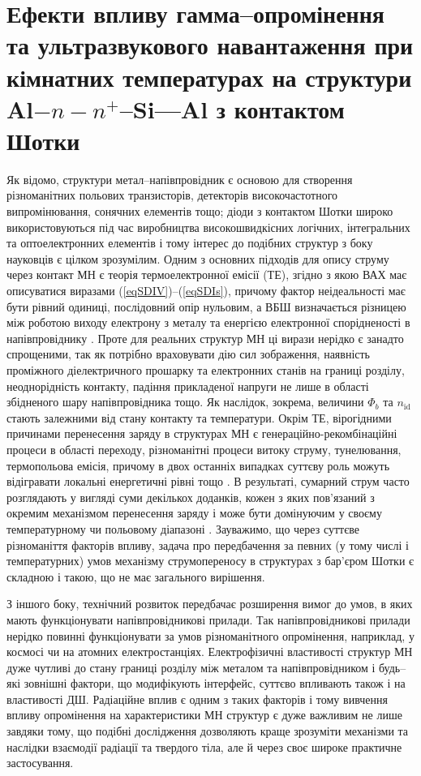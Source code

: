 \chapter{Ефекти впливу гамма--опромінення та ультразвукового навантаження при кімнатних температурах
на структури Al$-n-n^+$--Si---Al з контактом Шотки\label{Ch_GammaSD}}

Як відомо, структури метал--напівпровідник є основою для створення різноманітних польових транзисторів, детекторів високочастотного
випромінювання, сонячних елементів тощо;
діоди з контактом Шотки широко використовуються під час виробництва високошвидкісних логічних, інтегральних та оптоелектронних елементів
і тому інтерес до подібних структур з боку науковців є цілком зрозумілим.
Одним з основних підходів для опису струму через контакт МН є теорія термоелектронної емісії (ТЕ),
згідно з якою \cite{Colinge,Sze2012,Rhoderick1988,StrihaBook} ВАХ має описуватися виразами (\ref{eqSDIV})--(\ref{eqSDIs}),
причому фактор неідеальності має бути рівний одиниці, послідовний опір нульовим,
а ВБШ визначається різницею між роботою виходу електрону з металу та енергією електронної спорідненості в напівпровіднику \cite{Colinge}.
Проте для реальних структур МН ці вирази нерідко є занадто спрощеними, так як
потрібно враховувати дію сил зображення, наявність проміжного діелектричного прошарку та електронних станів на границі розділу,
неоднорідність контакту, падіння прикладеної напруги не лише в області збідненого шару напівпровідника тощо.
Як наслідок, зокрема, величини $\Phi_b$ та $n_\mathrm{id}$ стають залежними від стану контакту та температури.
Окрім ТЕ, вірогідними причинами перенесення заряду в структурах МН є генераційно-рекомбінаційні процеси в області переходу,
різноманітні процеси витоку струму, тунелювання, термопольова емісія,
причому в двох останніх випадках суттєву роль можуть відігравати локальні енергетичні рівні тощо \cite{Rhoderick1988,Arslan,Donoval2010,Huang,Evstropov,VRH:Lee,Sathaiya}.
В результаті, сумарний струм часто розглядають у вигляді суми декількох доданків,
кожен з яких пов'язаний з окремим механізмом перенесення заряду і може бути домінуючим у своєму температурному чи польовому діапазоні \cite{Arslan,Donoval2010,Huang,GELCZUK2014}.
Зауважимо, що через суттєве різноманіття факторів впливу, задача про передбачення за певних
(у тому числі і температурних) умов механізму струмопереносу в структурах з бар'єром Шотки є складною і такою, що не має загального вирішення.

З іншого боку, технічний розвиток передбачає розширення вимог до умов, в яких мають функціонувати напівпровідникові прилади.
Так напівпровідникові прилади нерідко повинні функціонувати за умов різноманітного опромінення, наприклад, у космосі чи на атомних електростанціях.
Електрофізичні властивості структур МН дуже чутливі до стану границі розділу між металом та напівпровідником і будь--які
зовнішні фактори, що модифікують інтерфейс, суттєво впливають також і на властивості ДШ.
Радіаційне вплив є одним з таких факторів і тому вивчення впливу опромінення на характеристики МН структур є дуже важливим не лише завдяки
тому, що подібні дослідження дозволяють краще зрозуміти механізми та наслідки взаємодії радіації та твердого тіла,
але й через своє широке практичне застосування.


